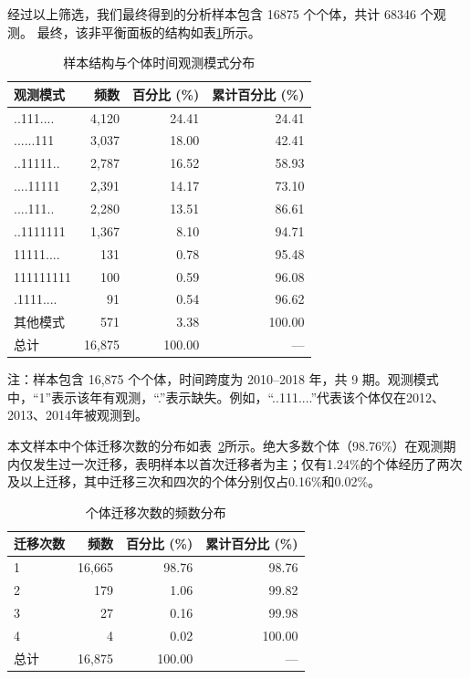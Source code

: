 \documentclass[
  a4paper,
  zihao=-4,
  fontset=mac,
  AutoFakeBold,
  AutoFakeSlant,
  oneside]{ctexbook}
\begin{document}
经过以上筛选，我们最终得到的分析样本包含 16875 个个体，共计 68346 个观测。
最终，该非平衡面板的结构如表\ref{tab:sample_structure}所示。
\begin{table}[!ht]
\centering
\caption{样本结构与个体时间观测模式分布}
\label{tab:sample_structure}
\begin{tabular}{lrrr}
\toprule
观测模式 & 频数 & 百分比 (\%) & 累计百分比 (\%) \\
\midrule
..111....   & 4,120 & 24.41 & 24.41 \\
......111   & 3,037 & 18.00 & 42.41 \\
..11111..   & 2,787 & 16.52 & 58.93 \\
....11111   & 2,391 & 14.17 & 73.10 \\
....111..   & 2,280 & 13.51 & 86.61 \\
..1111111   & 1,367 &  8.10 & 94.71 \\
11111....   &   131 &  0.78 & 95.48 \\
111111111   &   100 &  0.59 & 96.08 \\
.1111....   &    91 &  0.54 & 96.62 \\
其他模式     &   571 &  3.38 & 100.00 \\
\midrule
总计        & 16,875 & 100.00 & — \\
\bottomrule
\end{tabular}

\vspace{1em}
\begin{minipage}{\linewidth}
\small
注：样本包含 16,875 个个体，时间跨度为 2010–2018 年，共 9 期。观测模式中，“1”表示该年有观测，“.”表示缺失。例如，“..111....”代表该个体仅在2012、2013、2014年被观测到。
\end{minipage}
\end{table}

本文样本中个体迁移次数的分布如表~\ref{tab:migration_frequency}所示。绝大多数个体（98.76\%）在观测期内仅发生过一次迁移，表明样本以首次迁移者为主；仅有1.24\%的个体经历了两次及以上迁移，其中迁移三次和四次的个体分别仅占0.16\%和0.02\%。

\begin{table}[htbp]
\centering
\caption{个体迁移次数的频数分布}
\label{tab:migration_frequency}
\begin{tabular}{lrrr}
\toprule
迁移次数 & 频数 & 百分比 (\%) & 累计百分比 (\%) \\
\midrule
1 & 16,665 & 98.76 & 98.76 \\
2 &    179 &  1.06 & 99.82 \\
3 &     27 &  0.16 & 99.98 \\
4 &      4 &  0.02 & 100.00 \\
\midrule
总计 & 16,875 & 100.00 & — \\
\bottomrule
\end{tabular}
\end{table}
\end{document}
